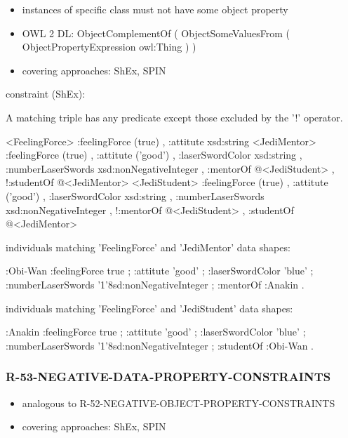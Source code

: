 \documentclass{llncs}
\begin{document}
\begin{itemize}
	\item instances of specific class must not have some object property
  \item OWL 2 DL: ObjectComplementOf ( ObjectSomeValuesFrom ( ObjectPropertyExpression owl:Thing ) )
	\item covering approaches: ShEx, SPIN
\end{itemize}

constraint (ShEx):

A matching triple has any predicate except those excluded by the '!' operator.

\begin{ex}
<FeelingForce> {
    :feelingForce (true) ,
    :attitute xsd:string }
<JediMentor> {
    :feelingForce (true) ,
    :attitute ('good') ,
    :laserSwordColor xsd:string ,
    :numberLaserSwords xsd:nonNegativeInteger ,
    :mentorOf @<JediStudent> ,
   !:studentOf @<JediMentor> }
<JediStudent> {
    :feelingForce (true) ,
    :attitute ('good') ,
    :laserSwordColor xsd:string ,
    :numberLaserSwords xsd:nonNegativeInteger ,
   !:mentorOf @<JediStudent> ,
    :studentOf @<JediMentor> }
\end{ex}

individuals matching 'FeelingForce' and 'JediMentor' data shapes:

\begin{ex}
:Obi-Wan 
    :feelingForce true ;
    :attitute 'good' ;
    :laserSwordColor 'blue' ;
    :numberLaserSwords '1'^^xsd:nonNegativeInteger ;
    :mentorOf :Anakin .
\end{ex}

individuals matching 'FeelingForce' and 'JediStudent' data shapes:

\begin{ex}
:Anakin 
    :feelingForce true ;
    :attitute 'good' ;
    :laserSwordColor 'blue' ;
    :numberLaserSwords '1'^^xsd:nonNegativeInteger ;
    :studentOf :Obi-Wan .
\end{ex}

\subsubsection{R-53-NEGATIVE-DATA-PROPERTY-CONSTRAINTS}

\begin{itemize}
	\item analogous to R-52-NEGATIVE-OBJECT-PROPERTY-CONSTRAINTS
	\item covering approaches: ShEx, SPIN
\end{itemize}
\end{document}
